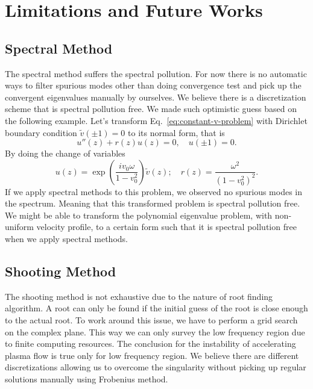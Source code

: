 \section{Limitations and Future Works}
\subsection{Spectral Method}
The spectral method suffers the spectral pollution. For now there is no automatic ways to filter spurious modes other than doing convergence test and pick up the convergent eigenvalues manually by ourselves. We believe there is a discretization scheme that is spectral pollution free. We made such optimistic guess based on the following example. Let's transform Eq.~\ref{eq:constant-v-problem} with Dirichlet boundary condition $\tilde{v}(\pm 1) = 0$ to its normal form, that is
\begin{equation}
	u''(z) + r(z)u(z) = 0, \quad u(\pm 1) = 0.
\end{equation}
By doing the change of variables
\begin{equation}
	u(z) = \exp\left(\frac{iv_0\omega}{1-v_0^2}\right)\tilde{v}(z); \quad
	r(z) = \frac{\omega^2}{(1-v_0^2)^2}.
\end{equation}
If we apply spectral methods to this problem, we observed no spurious modes in the spectrum. Meaning that this transformed problem is spectral pollution free. We might be able to transform the polynomial eigenvalue problem, with non-uniform velocity profile, to a certain form such that it is spectral pollution free when we apply spectral methods.

\subsection{Shooting Method}
The shooting method is not exhaustive due to the nature of root finding algorithm. A root can only be found if the initial guess of the root is close enough to the actual root. To work around this issue, we have to perform a grid search on the complex plane. This way we can only survey the low frequency region due to finite computing resources. The conclusion for the instability of accelerating plasma flow is true only for low frequency region. We believe there are different discretizations allowing us to overcome the singularity without picking up regular solutions manually using Frobenius method.

